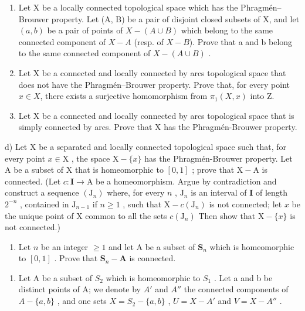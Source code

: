 \begin{enumerate}
\def\labelenumi{\alph{enumi})}
\item
  Let X be a locally connected topological space which has the Phragmén–Brouwer property. Let (A, B) be a pair of disjoint closed subsets of X, and let \((a, b)\) be a pair of points of \(X-(A \cup B)\) which belong to the same connected component of \(X-A\) (resp. of \(X-B\)). Prove that a and b belong to the same connected component of \(X-(A \cup B)\) .
\item
  Let X be a connected and locally connected by arcs topological space that does not have the Phragmén–Brouwer property. Prove that, for every point \(x \in X\), there exists a surjective homomorphism from \(\pi_{1}(X, x)\) into Z.
\item
  Let X be a connected and locally connected by arcs topological space that is simply connected by arcs. Prove that X has the Phragmén-Brouwer property.
\end{enumerate}

d) Let X be a separated and locally connected topological space such that, for every point \(x \in \mathrm{X}\) , the space \(\mathrm{X} - \{x\}\) has the Phragmén-Brouwer property. Let A be a subset of X that is homeomorphic to \([0,1]\) ; prove that \(\mathrm{X} - \mathrm{A}\) is connected. (Let \(c: \mathbf{I} \to \mathrm{A}\) be a homeomorphism. Argue by contradiction and construct a sequence \((\mathrm{J}_n)\) where, for every \(n\) , \(\mathrm{J}_n\) is an interval of \(\mathbf{I}\) of length \(2^{-n}\) , contained in \(\mathrm{J}_{n-1}\) if \(n \geqslant 1\) , such that \(\mathrm{X} - c(\mathrm{J}_n)\) is not connected; let \(x\) be the unique point of X common to all the sets \(c(\mathrm{J}_n)\) Then show that \(\mathrm{X} - \{x\}\) is not connected.)

\begin{enumerate}
\def\labelenumi{\alph{enumi})}
\setcounter{enumi}{4}
\tightlist
\item
  Let \(n\) be an integer \(\geqslant 1\) and let A be a subset of \(\mathbf{S}_n\) which is homeomorphic to \([0,1]\) . Prove that \(\mathbf{S}_n - \mathbf{A}\) is connected.
\end{enumerate}

\begin{enumerate}
\def\labelenumi{\arabic{enumi})}
\setcounter{enumi}{15}
\tightlist
\item
  Let A be a subset of \(S_{2}\) which is homeomorphic to \(S_{1}\) . Let a and b be distinct points of A; we denote by \(A'\) and \(A''\) the connected components of \(A-\{a,b\}\) , and one sets \(X=S_{2}-\{a,b\}\) , \(U=X-A'\) and \(V=X-A''\) .
\end{enumerate}

